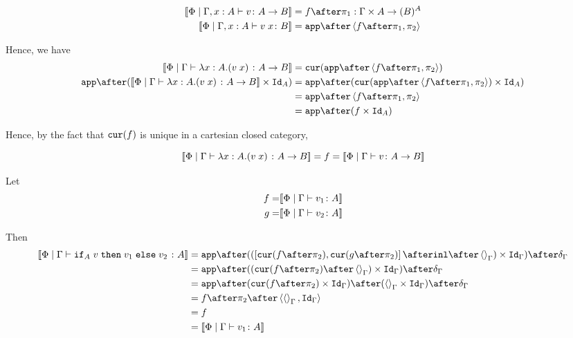 {\begin{align}
    \deno{\etyperelation{\P}{\gax}{v}{\ab}} & = f \after \p : \G \times A \rightarrow (B)^A \\
    \deno{\etyperelation{\P}{\gax}{\apply{v}{x}}{B}} & = \app\after\pr{f \after \p}{\pp} \\
\end{align}

Hence, we have 
\begin{equation}
    \begin{split}
        \deno{\gpetyperelation{\lam{x}{A}{(\apply{v}{x})}}{\ab}} & = \cur{\app\after\pr{f \after \p}{\pp}}\\
        \app\after(\deno{\gpetyperelation{\lam{x}{A}{(\apply{v}{x})}}{\ab}} \times \Id{A}) & = \app \after(\cur{\app\after\pr{f \after \p}{\pp}}\times \Id{A})\\
        & = \app \after\pr{f\after\p}{\pp}\\
        & = \app\after(f\times\Id{A})
    \end{split}
\end{equation}

Hence, by the fact that $\texttt{cur}(f)$ is unique in a cartesian closed category, 

\begin{equation}
    {\bf [\![}\Phi\mid\Gamma \vdash \lambda x : A. (v\; x)\; \colon A\rightarrow B{\bf ]\!]} = f ={\bf [\![}\Phi\mid\Gamma \vdash v \colon A\rightarrow B{\bf ]\!]}
\end{equation}

Let
\begin{align}
    f = &{\bf [\![}\Phi\mid\Gamma \vdash v_1 \colon A{\bf ]\!]}\\
    g = &{\bf [\![}\Phi\mid\Gamma \vdash v_2 \colon A{\bf ]\!]}\\
\end{align}

Then
\begin{equation}
    \begin{split}
        \deno{\gpetyperelation{\pifthenelse{A}{v}{v_1}{v_2}}{A}} & = \ifMorph{\inl\after\term{\G}}{f}{g} \\
        & = \app\after((\cur{f\after\pp}\after\term{\G})\times\idg)\after\diag{\G}\\
        & = \app\after(\cur{f\after\pp}\times\idg)\after(\term{\G}\times\idg)\after\diag{\G}\\
        & = f\after\pp\after\pr{\term{\G}}{\idg}\\
        & = f \\
        & = \deno{\gpetyperelation{v_1}{A}}\\
    \end{split}
\end{equation}


}
